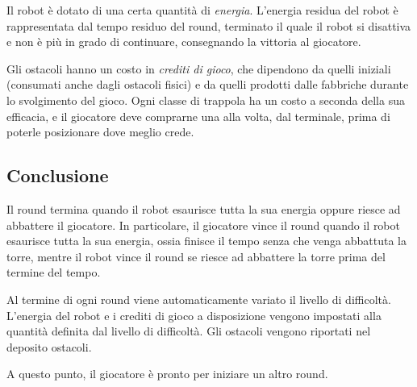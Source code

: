 Il robot è dotato di una certa quantità di \emph{energia}. L'energia residua del robot è rappresentata dal tempo residuo del round, terminato il quale il robot si disattiva e non è più in grado di continuare, consegnando la vittoria al giocatore.

Gli ostacoli hanno un costo in \emph{crediti di gioco}, che dipendono da quelli iniziali (consumati anche dagli ostacoli fisici) e da quelli prodotti dalle fabbriche durante lo svolgimento del gioco. Ogni classe di trappola ha un costo a seconda della sua efficacia, e il giocatore deve comprarne una alla volta, dal terminale, prima di poterle posizionare dove meglio crede.

	\subsection*{Conclusione} 
Il round termina quando il robot esaurisce tutta la sua energia oppure riesce ad abbattere il giocatore. In particolare, il giocatore vince il round quando il robot esaurisce tutta la sua energia, ossia finisce il tempo senza che venga abbattuta la torre, mentre il robot vince il round se riesce ad abbattere la torre prima del termine del tempo.

Al termine di ogni round viene automaticamente variato il livello di difficoltà. L'energia del robot e i crediti di gioco a disposizione vengono impostati alla quantità definita dal livello di difficoltà. Gli ostacoli vengono riportati nel deposito ostacoli.

A questo punto, il giocatore è pronto per iniziare un altro round.